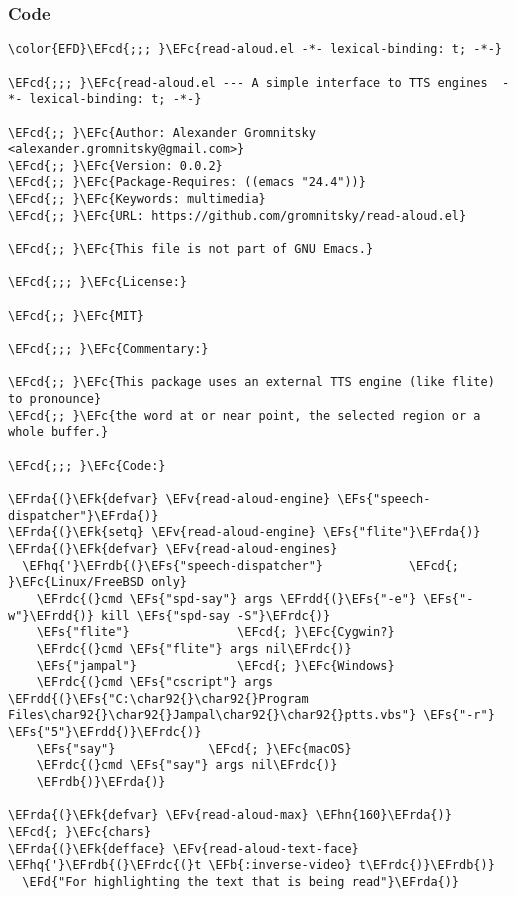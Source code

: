 \documentclass[a4wide,10pt]{article}
\newcommand{\EFc}[1]{\textcolor{EFc}{#1}} %
\newcommand{\EFcd}[1]{\textcolor{EFcd}{#1}} %
\newcommand{\EFs}[1]{\textcolor{EFs}{#1}} %
\newcommand{\EFd}[1]{\textcolor{EFd}{#1}} %
\newcommand{\EFk}[1]{\textcolor{EFk}{#1}} %
\newcommand{\EFb}[1]{\textcolor{EFb}{#1}} %
\newcommand{\EFv}[1]{\textcolor{EFv}{#1}} %
\newcommand{\EFhn}[1]{\textcolor{EFhn}{\textbf{#1}}} %
\newcommand{\EFhq}[1]{\textcolor{EFhq}{#1}} %
\newcommand{\EFrda}[1]{\textcolor{EFrda}{#1}} %
\newcommand{\EFrdb}[1]{\textcolor{EFrdb}{#1}} %
\newcommand{\EFrdc}[1]{\textcolor{EFrdc}{#1}} %
\newcommand{\EFrdd}[1]{\textcolor{EFrdd}{#1}} %
\begin{document}
\subsubsection{Code}
\label{sec:org2ba83bd}
\begin{Code}
\begin{Verbatim}
\color{EFD}\EFcd{;;; }\EFc{read-aloud.el -*- lexical-binding: t; -*-}

\EFcd{;;; }\EFc{read-aloud.el --- A simple interface to TTS engines  -*- lexical-binding: t; -*-}

\EFcd{;; }\EFc{Author: Alexander Gromnitsky <alexander.gromnitsky@gmail.com>}
\EFcd{;; }\EFc{Version: 0.0.2}
\EFcd{;; }\EFc{Package-Requires: ((emacs "24.4"))}
\EFcd{;; }\EFc{Keywords: multimedia}
\EFcd{;; }\EFc{URL: https://github.com/gromnitsky/read-aloud.el}

\EFcd{;; }\EFc{This file is not part of GNU Emacs.}

\EFcd{;;; }\EFc{License:}

\EFcd{;; }\EFc{MIT}

\EFcd{;;; }\EFc{Commentary:}

\EFcd{;; }\EFc{This package uses an external TTS engine (like flite) to pronounce}
\EFcd{;; }\EFc{the word at or near point, the selected region or a whole buffer.}

\EFcd{;;; }\EFc{Code:}

\EFrda{(}\EFk{defvar} \EFv{read-aloud-engine} \EFs{"speech-dispatcher"}\EFrda{)}
\EFrda{(}\EFk{setq} \EFv{read-aloud-engine} \EFs{"flite"}\EFrda{)}
\EFrda{(}\EFk{defvar} \EFv{read-aloud-engines}
  \EFhq{'}\EFrdb{(}\EFs{"speech-dispatcher"}			\EFcd{; }\EFc{Linux/FreeBSD only}
    \EFrdc{(}cmd \EFs{"spd-say"} args \EFrdd{(}\EFs{"-e"} \EFs{"-w"}\EFrdd{)} kill \EFs{"spd-say -S"}\EFrdc{)}
    \EFs{"flite"}				\EFcd{; }\EFc{Cygwin?}
    \EFrdc{(}cmd \EFs{"flite"} args nil\EFrdc{)}
    \EFs{"jampal"}				\EFcd{; }\EFc{Windows}
    \EFrdc{(}cmd \EFs{"cscript"} args \EFrdd{(}\EFs{"C:\char92{}\char92{}Program Files\char92{}\char92{}Jampal\char92{}\char92{}ptts.vbs"} \EFs{"-r"} \EFs{"5"}\EFrdd{)}\EFrdc{)}
    \EFs{"say"}				\EFcd{; }\EFc{macOS}
    \EFrdc{(}cmd \EFs{"say"} args nil\EFrdc{)}
    \EFrdb{)}\EFrda{)}

\EFrda{(}\EFk{defvar} \EFv{read-aloud-max} \EFhn{160}\EFrda{)}		\EFcd{; }\EFc{chars}
\EFrda{(}\EFk{defface} \EFv{read-aloud-text-face} \EFhq{'}\EFrdb{(}\EFrdc{(}t \EFb{:inverse-video} t\EFrdc{)}\EFrdb{)}
  \EFd{"For highlighting the text that is being read"}\EFrda{)}




\end{Verbatim}
\end{Code}
\end{document}
